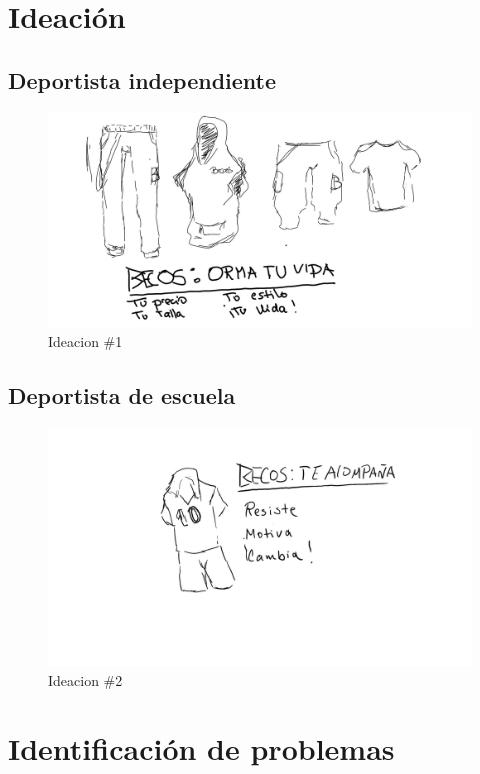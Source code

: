 \documentclass[11pt]{article}
\begin{document}
\newpage
\section{Ideación}
\label{sec:org2b197e2}
\subsection{Deportista independiente}
\label{sec:orgdecd8a1}
\begin{figure}[H]
\centering
\includegraphics[width=.9\linewidth]{./assets/build/ideacion_1.jpeg}
\caption{Ideacion \#1}
\end{figure}



\subsection{Deportista de escuela}
\label{sec:org514e8e9}

\begin{figure}[H]
\centering
\includegraphics[width=.9\linewidth]{./assets/build/ideacion_2.jpg}
\caption{Ideacion \#2}
\end{figure}


\section{Identificación de problemas}
\label{sec:orgeff15b6}
\end{document}
